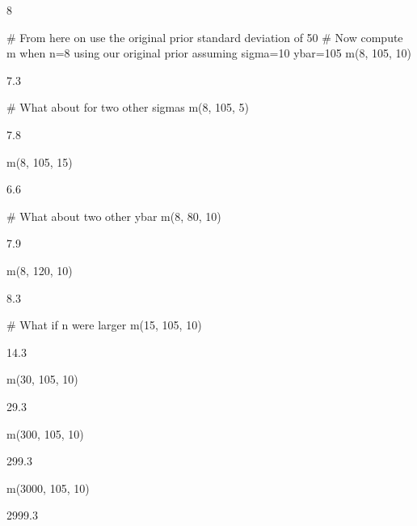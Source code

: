 \begin{Schunk}
\begin{Soutput}
[1] 8
\end{Soutput}
\begin{Sinput}
# From here on use the original prior standard deviation of 50
# Now compute m when n=8 using our original prior assuming sigma=10 ybar=105
m(8, 105, 10)
\end{Sinput}
\begin{Soutput}
[1] 7.3
\end{Soutput}
\begin{Sinput}
# What about for two other sigmas
m(8, 105, 5)
\end{Sinput}
\begin{Soutput}
[1] 7.8
\end{Soutput}
\begin{Sinput}
m(8, 105, 15)
\end{Sinput}
\begin{Soutput}
[1] 6.6
\end{Soutput}
\begin{Sinput}
# What about two other ybar
m(8, 80, 10)
\end{Sinput}
\begin{Soutput}
[1] 7.9
\end{Soutput}
\begin{Sinput}
m(8, 120, 10)
\end{Sinput}
\begin{Soutput}
[1] 8.3
\end{Soutput}
\begin{Sinput}
# What if n were larger
m(15, 105, 10)
\end{Sinput}
\begin{Soutput}
[1] 14.3
\end{Soutput}
\begin{Sinput}
m(30, 105, 10)
\end{Sinput}
\begin{Soutput}
[1] 29.3
\end{Soutput}
\begin{Sinput}
m(300, 105, 10)
\end{Sinput}
\begin{Soutput}
[1] 299.3
\end{Soutput}
\begin{Sinput}
m(3000, 105, 10)
\end{Sinput}
\begin{Soutput}
[1] 2999.3
\end{Soutput}
\end{Schunk}
